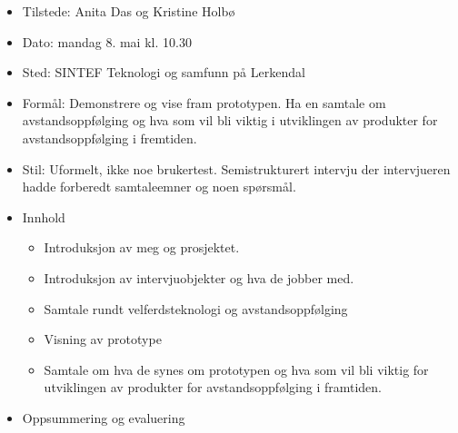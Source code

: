 \iffalse

\begin{itemize}
\tightlist
\item
  Tilstede: Anita Das og Kristine Holbø
\item
  Dato: mandag 8. mai kl. 10.30
\item
  Sted: SINTEF Teknologi og samfunn på Lerkendal
\item
  Formål: Demonstrere og vise fram prototypen. Ha en samtale om
  avstandsoppfølging og hva som vil bli viktig i utviklingen av
  produkter for avstandsoppfølging i fremtiden.
\item
  Stil: Uformelt, ikke noe brukertest. Semistrukturert intervju der
  intervjueren hadde forberedt samtaleemner og noen spørsmål.
\item
  Innhold

  \begin{itemize}
  \tightlist
  \item
    Introduksjon av meg og prosjektet.
  \item
    Introduksjon av intervjuobjekter og hva de jobber med.
  \item
    Samtale rundt velferdsteknologi og avstandsoppfølging
  \item
    Visning av prototype
  \item
    Samtale om hva de synes om prototypen og hva som vil bli viktig for
    utviklingen av produkter for avstandsoppfølging i framtiden.
  \end{itemize}
\item
  Oppsummering og evaluering


\end{itemize}
